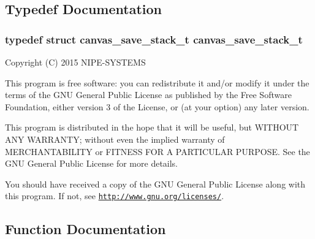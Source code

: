 \subsection{Typedef Documentation}
\hypertarget{canvas-save_8h_ac48d601a20f95c93f677cd13d184ea11}{}
\subsubsection[{canvas\+\_\+save\+\_\+stack\+\_\+t}]{\setlength{\rightskip}{0pt plus 5cm}typedef struct {\bf canvas\+\_\+save\+\_\+stack\+\_\+t}  {\bf canvas\+\_\+save\+\_\+stack\+\_\+t}}\label{canvas-save_8h_ac48d601a20f95c93f677cd13d184ea11}
Copyright (C) 2015 N\+I\+P\+E-\/\+S\+Y\+S\+T\+E\+M\+S

This program is free software\+: you can redistribute it and/or modify it under the terms of the G\+N\+U General Public License as published by the Free Software Foundation, either version 3 of the License, or (at your option) any later version.

This program is distributed in the hope that it will be useful, but W\+I\+T\+H\+O\+U\+T A\+N\+Y W\+A\+R\+R\+A\+N\+T\+Y; without even the implied warranty of M\+E\+R\+C\+H\+A\+N\+T\+A\+B\+I\+L\+I\+T\+Y or F\+I\+T\+N\+E\+S\+S F\+O\+R A P\+A\+R\+T\+I\+C\+U\+L\+A\+R P\+U\+R\+P\+O\+S\+E. See the G\+N\+U General Public License for more details.

You should have received a copy of the G\+N\+U General Public License along with this program. If not, see \href{http://www.gnu.org/licenses/}{\tt http\+://www.\+gnu.\+org/licenses/}. 

\subsection{Function Documentation}
\hypertarget{canvas-save_8h_aa4d2313aaea02c86e42f86ec5975fbe2}{}
